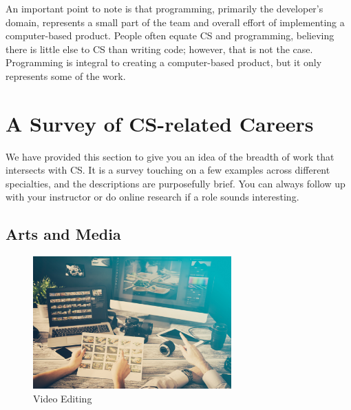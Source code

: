 An important point to note is that programming, primarily the developer's domain, represents a small part of the team and overall effort of implementing a computer-based product. People often equate CS and programming, believing there is little else to CS than writing code; however, that is not the case. Programming is integral to creating a computer-based product, but it only represents some of the work.

\newpage


\section{A Survey of CS-related Careers}

We have provided this section to give you an idea of the breadth of work that intersects with CS. It is a survey touching on a few examples across different specialties, and the descriptions are purposefully brief. You can always follow up with your instructor or do online research if a role sounds interesting.

\subsection{Arts and Media}


\begin{figure}[H]
	\begin{center}
		\caption{Video Editing}
		\vskip 4pt
		\includegraphics[height=2in]{images/careers/iStock-922654000.small.jpg}
	\end{center}
\end{figure}

